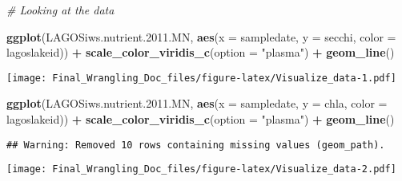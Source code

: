\documentclass[]{article}
\newenvironment{Shaded}{\begin{snugshade}}{\end{snugshade}}
\newcommand{\CommentTok}[1]{\textcolor[rgb]{0.56,0.35,0.01}{\textit{#1}}}
\newcommand{\DataTypeTok}[1]{\textcolor[rgb]{0.13,0.29,0.53}{#1}}
\newcommand{\FloatTok}[1]{\textcolor[rgb]{0.00,0.00,0.81}{#1}}
\newcommand{\KeywordTok}[1]{\textcolor[rgb]{0.13,0.29,0.53}{\textbf{#1}}}
\newcommand{\NormalTok}[1]{#1}
\newcommand{\OperatorTok}[1]{\textcolor[rgb]{0.81,0.36,0.00}{\textbf{#1}}}
\newcommand{\StringTok}[1]{\textcolor[rgb]{0.31,0.60,0.02}{#1}}
\begin{document}
\begin{Shaded}
\begin{Highlighting}[]
\CommentTok{# Looking at the data}

\KeywordTok{ggplot}\NormalTok{(LAGOSiws.nutrient.}\FloatTok{2011.}\NormalTok{MN, }\KeywordTok{aes}\NormalTok{(}\DataTypeTok{x =}\NormalTok{ sampledate, }\DataTypeTok{y =}\NormalTok{ secchi, }\DataTypeTok{color =}\NormalTok{ lagoslakeid)) }\OperatorTok{+}
\StringTok{  }\KeywordTok{scale_color_viridis_c}\NormalTok{(}\DataTypeTok{option =} \StringTok{"plasma"}\NormalTok{) }\OperatorTok{+}
\StringTok{  }\KeywordTok{geom_line}\NormalTok{() }
\end{Highlighting}
\end{Shaded}

\texttt{[image: Final\_Wrangling\_Doc\_files/figure-latex/Visualize\_data-1.pdf]}

\begin{Shaded}
\begin{Highlighting}[]
\KeywordTok{ggplot}\NormalTok{(LAGOSiws.nutrient.}\FloatTok{2011.}\NormalTok{MN, }\KeywordTok{aes}\NormalTok{(}\DataTypeTok{x =}\NormalTok{ sampledate, }\DataTypeTok{y =}\NormalTok{ chla, }\DataTypeTok{color =}\NormalTok{ lagoslakeid)) }\OperatorTok{+}
\StringTok{  }\KeywordTok{scale_color_viridis_c}\NormalTok{(}\DataTypeTok{option =} \StringTok{"plasma"}\NormalTok{) }\OperatorTok{+}
\StringTok{  }\KeywordTok{geom_line}\NormalTok{() }
\end{Highlighting}
\end{Shaded}

\begin{verbatim}
## Warning: Removed 10 rows containing missing values (geom_path).
\end{verbatim}

\texttt{[image: Final\_Wrangling\_Doc\_files/figure-latex/Visualize\_data-2.pdf]}
\end{document}
